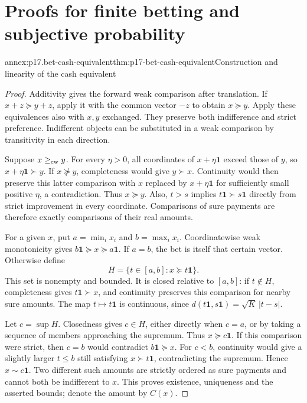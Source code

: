 \section{Proofs for finite betting and subjective probability}
\label{sec:annex-p17-finite-subjective-probability}

\begin{annexitem}{annex:p17.bet-cash-equivalent}{thm:p17-bet-cash-equivalent}{Construction and linearity of the cash equivalent}
\begin{proof}
Additivity gives the forward weak comparison after translation.
If \(x+z\succeq y+z\), apply it with the common vector \(-z\)
to obtain \(x\succeq y\). Apply these equivalences also with
\(x,y\) exchanged. They preserve both indifference and strict preference.
Indifferent objects can be substituted in a weak comparison by
transitivity in each direction.

Suppose \(x\geq_{\rm cw}y\). For every \(\eta>0\), all coordinates
of \(x+\eta\mathbf1\) exceed those of \(y\), so
\(x+\eta\mathbf1\succ y\). If \(x\not\succeq y\), completeness
would give \(y\succ x\). Continuity would then preserve this latter
comparison with \(x\) replaced by \(x+\eta\mathbf1\) for
sufficiently small positive \(\eta\), a contradiction. Thus
\(x\succeq y\). Also, \(t>s\) implies
\(t\mathbf1\succ s\mathbf1\) directly from strict improvement
in every coordinate. Comparisons of sure payments are therefore
exactly comparisons of their real amounts.

For a given \(x\), put \(a=\min_i x_i\) and \(b=\max_i x_i\).
Coordinatewise weak monotonicity gives
\(b\mathbf1\succeq x\succeq a\mathbf1\).
If \(a=b\), the bet is itself that certain vector. Otherwise define
\[
                   H=\{t\in[a,b]:x\succeq t\mathbf1\}.
\]
This set is nonempty and bounded. It is closed relative to \([a,b]\):
if \(t\notin H\), completeness gives \(t\mathbf1\succ x\),
and continuity preserves this comparison for nearby sure amounts.
The map \(t\mapsto t\mathbf1\) is continuous, since
\(d(t\mathbf1,s\mathbf1)=\sqrt K\,|t-s|\).

Let \(c=\sup H\). Closedness gives \(c\in H\), either directly
when \(c=a\), or by taking a sequence of members approaching the
supremum. Thus \(x\succeq c\mathbf1\). If this comparison were
strict, then \(c=b\) would contradict \(b\mathbf1\succeq x\).
For \(c<b\), continuity would give a slightly larger \(t\leq b\)
still satisfying \(x\succ t\mathbf1\), contradicting the supremum.
Hence \(x\sim c\mathbf1\). Two different such amounts are strictly
ordered as sure payments and cannot both be indifferent to \(x\).
This proves existence, uniqueness and the asserted bounds; denote
the amount by \(C(x)\).


\end{proof}
\end{annexitem}
